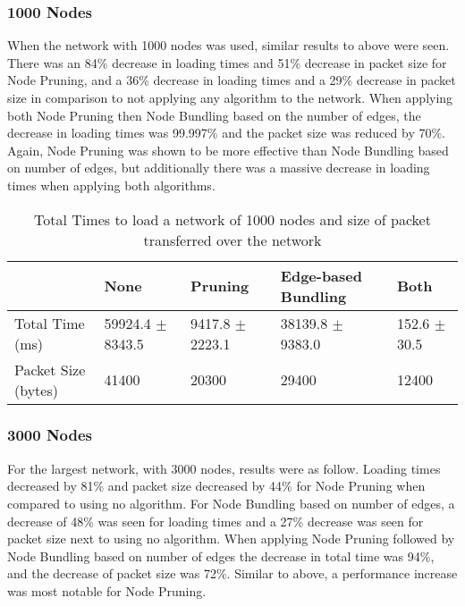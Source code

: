 \documentclass[../dissertation.tex]{subfiles}
\begin{document}
\subsubsection{1000 Nodes}

When the network with 1000 nodes was used, similar results to above were seen. There was an 84\% decrease in loading times and 51\% decrease in packet size for Node Pruning, and a 36\% decrease in loading times and a 29\% decrease in packet size in comparison to not applying any algorithm to the network. When applying both Node Pruning then Node Bundling based on the number of edges, the decrease in loading times was 99.997\% and the packet size was reduced by 70\%. Again, Node Pruning was shown to be more effective than Node Bundling based on number of edges, but additionally there was a massive decrease in loading times when applying both algorithms.

\begin{table}[H]
\centering
\begin{tabular}{|l|l|l|l|l|}
\hline
                    & \textbf{None}        & \textbf{Pruning}    & \textbf{Edge-based Bundling}        & \textbf{Both}    \\ \hline
Total Time (ms)     & 59924.4 $\pm$ 8343.5 & 9417.8 $\pm$ 2223.1 & 38139.8 $\pm$ 9383.0 & 152.6 $\pm$ 30.5 \\ \hline
Packet Size (bytes) & 41400                & 20300               & 29400                & 12400            \\ \hline
\end{tabular}
\caption{Total Times to load a network of 1000 nodes and size of packet transferred over the network}
\label{table:1000-nodes}
\end{table}

\subsubsection{3000 Nodes}

For the largest network, with 3000 nodes, results were as follow. Loading times decreased by 81\% and packet size decreased by 44\% for Node Pruning when compared to using no algorithm. For Node Bundling based on number of edges, a decrease of 48\% was seen for loading times and a 27\% decrease was seen for packet size next to using no algorithm. When applying Node Pruning followed by Node Bundling based on number of edges the decrease in total time was 94\%, and the decrease of packet size was 72\%. Similar to above, a performance increase was most notable for Node Pruning. 
\end{document}
